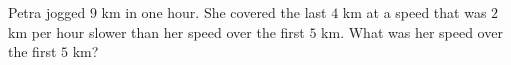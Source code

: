 Petra jogged $9$ km in one hour. She covered the last $4$ km at a speed that was $2$ km per hour slower than her speed over the first $5$ km. What was her speed over the first $5$ km?
